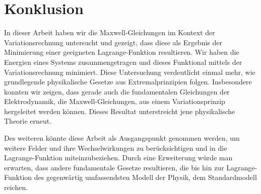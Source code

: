%
%
%
%
\section{Konklusion}
In dieser Arbeit haben wir die Maxwell-Gleichungen im Kontext der Variationsrechnung untersucht und gezeigt, dass diese als Ergebnis der Minimierung einer geeigneten Lagrange-Funktion resultieren. Wir haben die Energien eines Systems zusammengetragen und dieses Funktional mittels der Variationsrechnung minimiert.
Diese Untersuchung verdeutlicht einmal mehr, wie grundlegende physikalische Gesetze aus Extremalprinzipien folgen. 
Insbesondere konnten wir zeigen, dass gerade auch die fundamentalen Gleichungen der Elektrodynamik, die Maxwell-Gleichungen, aus einem Variationsprinzip hergeleitet werden können. Dieses Resultat unterstreicht jene physikalische Theorie erneut. 

Des weiteren könnte diese Arbeit als Ausgangspunkt genommen werden, um weitere Felder und ihre Wechselwirkungen zu berücksichtigen und in die Lagrange-Funktion miteinzubeziehen. Durch eine Erweiterung würde man erwarten, dass andere fundamentale Gesetze resultieren, die bis hin zur Lagrange-Funktion des gegenwärtig umfassendsten Modell der Physik, dem Standardmodell reichen.
